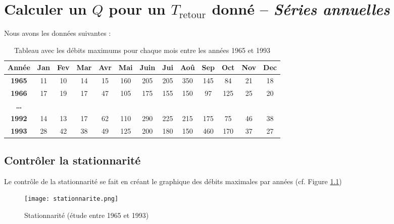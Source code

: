 \chapter{Calculer un $Q$ pour un $T_\text{retour}$ donné -- \textit{Séries annuelles}}

Nous avons les données suivantes :
\begin{table}[H]
    \centering
    \begin{tabular}{|c||c|c|c|c|c|c|c|c|c|c|c|c|}
        \hline
        \textbf{Année} & \textbf{Jan} & \textbf{Fev} & \textbf{Mar} & \textbf{Avr} & \textbf{Mai} & \textbf{Juin} & \textbf{Jui} & \textbf{Aoû} & \textbf{Sep} & \textbf{Oct} & \textbf{Nov} & \textbf{Dec} \\
        \hline \hline
        \textbf{1965}  & 11 & \cellcolor{green}10 & 14 & 15 & 160 & 205 & 205 & \cellcolor{red}350 & 145 &  84 &  21 & 18 \\
        \hline
        \textbf{1966}  & \cellcolor{green}17 & 19 & 17 & 47 & 105 & \cellcolor{red}175 & 155 & 150 &  97 & 125 &  25 & 20 \\
        \hline
        \textbf{\dots} &    &    &    &    &     &     &     &     &       &     &     &      \\
        \hline
        \textbf{1992}  & 14 & \cellcolor{green}13 & 17 & 62 & 110 & \cellcolor{red}290 & 225 & 215 & 175 &  75 &  46 & 38 \\
        \hline
        \textbf{1993}  & 28 & 42 & 38 & 49 & 125 & 200 & 180 & 150 & \cellcolor{red}460 & 170 &  37 & \cellcolor{green}27 \\
        \hline
    \end{tabular}
    \caption{Tableau avec les débits maximums pour chaque mois entre les années 1965 et 1993}
    \label{tab:seriesAnnuellesMaximum}
\end{table}


\section{Contrôler la stationnarité}
Le contrôle de la stationnarité se fait en créant le graphique des débits maximales par années (cf. Figure \ref{graph:stationnarite})
\begin{figure}[H]
    \centering
    \texttt{[image: stationnarite.png]}
    \caption{Stationnarité (étude entre 1965 et 1993)}
    \label{graph:stationnarite}
\end{figure}


